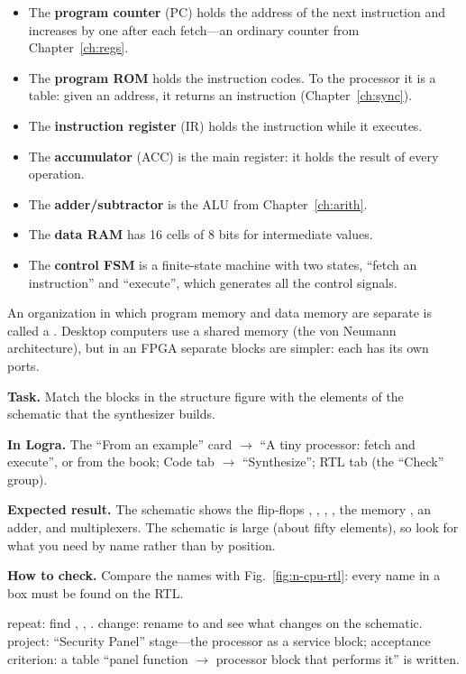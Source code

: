 \begin{itemize}
  \item The \textbf{program counter} (PC) holds the address of the next instruction
        and increases by one after each fetch---an ordinary counter from
        Chapter~\ref{ch:regs}.
  \item The \textbf{program ROM} holds the instruction codes. To the processor it is
        a table: given an address, it returns an instruction (Chapter~\ref{ch:sync}).
  \item The \textbf{instruction register} (IR) holds the instruction while it executes.
  \item The \textbf{accumulator} (ACC) is the main register: it holds the result of
        every operation.
  \item The \textbf{adder/subtractor} is the ALU from Chapter~\ref{ch:arith}.
  \item The \textbf{data RAM} has 16 cells of 8 bits for intermediate values.
  \item The \textbf{control FSM} is a finite-state machine with two states,
        ``fetch an instruction'' and ``execute'', which generates all the control
        signals.
\end{itemize}

An organization in which program memory and data memory are separate is called a
. Desktop computers use a shared memory (the von
Neumann architecture), but in an FPGA separate blocks are simpler: each has its
own ports.

\begin{diybox}
\textbf{Task.} Match the blocks in the structure figure with the elements of the schematic that the synthesizer builds.

\textbf{In Logra.} The ``From an example'' card $\to$ ``A tiny processor: fetch and execute'', or  from the book; Code tab $\to$ ``Synthesize''; RTL tab (the ``Check'' group).

\textbf{Expected result.} The schematic shows the flip-flops , , , , the memory , an adder, and multiplexers. The schematic is large (about fifty elements), so look for what you need by name rather than by position.

\textbf{How to check.} Compare the names with Fig.~\ref{fig:n-cpu-rtl}: every name in a box must be found on the RTL.

 repeat: find , , .  change: rename  to  and see what changes on the schematic.  project: ``Security Panel'' stage---the processor as a service block; acceptance criterion: a table ``panel function $\to$ processor block that performs it'' is written.
\end{diybox}


